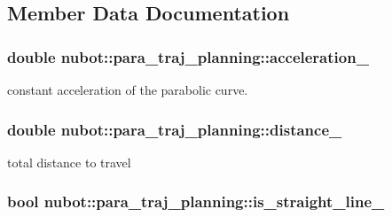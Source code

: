 \subsection{Member Data Documentation}
\hypertarget{classnubot_1_1para__traj__planning_ac2f88068a317316a2e483be7d75a71b8}{
\subsubsection[{acceleration\-\_\-}]{\setlength{\rightskip}{0pt plus 5cm}double nubot\-::para\-\_\-traj\-\_\-planning\-::acceleration\-\_\-\hspace{0.3cm}{\ttfamily [private]}}}\label{classnubot_1_1para__traj__planning_ac2f88068a317316a2e483be7d75a71b8}


constant acceleration of the parabolic curve. 

\hypertarget{classnubot_1_1para__traj__planning_a6115be17c446c1a2437b5575baf3f5a8}{
\subsubsection[{distance\-\_\-}]{\setlength{\rightskip}{0pt plus 5cm}double nubot\-::para\-\_\-traj\-\_\-planning\-::distance\-\_\-\hspace{0.3cm}{\ttfamily [private]}}}\label{classnubot_1_1para__traj__planning_a6115be17c446c1a2437b5575baf3f5a8}


total distance to travel 

\hypertarget{classnubot_1_1para__traj__planning_a84667362f94667e70f1cf67829645a7d}{
\subsubsection[{is\-\_\-straight\-\_\-line\-\_\-}]{\setlength{\rightskip}{0pt plus 5cm}bool nubot\-::para\-\_\-traj\-\_\-planning\-::is\-\_\-straight\-\_\-line\-\_\-\hspace{0.3cm}{\ttfamily [private]}}}\label{classnubot_1_1para__traj__planning_a84667362f94667e70f1cf67829645a7d}


